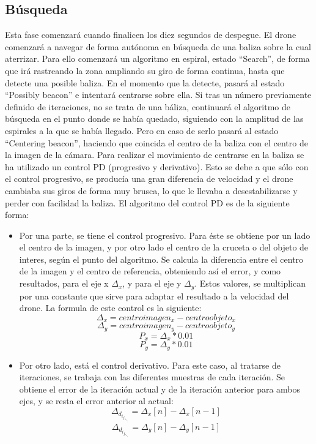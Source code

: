 \subsection{B\'usqueda}
\hspace{1 cm} Esta fase comenzar\'a cuando finalicen los diez segundos de despegue. El drone comenzar\'a a navegar de forma aut\'onoma en b\'usqueda de una baliza sobre la cual aterrizar. Para ello comenzar\'a un algoritmo en espiral, estado "`Search"', de forma que ir\'a rastreando la zona ampliando su giro de forma continua, hasta que detecte una posible baliza. En el momento que la detecte, pasar\'a al estado "`Possibly beacon"' e intentar\'a centrarse sobre ella. Si tras un n\'umero previamente definido de iteraciones, no se trata de una b\'aliza, continuar\'a el algoritmo de b\'usqueda en el punto donde se hab\'ia quedado, siguiendo con la amplitud de las espirales a la que se hab\'ia llegado. Pero en caso de serlo pasar\'a al estado "`Centering beacon"', haciendo que coincida el centro de la baliza con el centro de la imagen de la c\'amara. Para realizar el movimiento de centrarse en la baliza se ha utilizado un control PD (progresivo y derivativo). Esto se debe a que s\'olo con el control progresivo, se produc\'ia una gran diferencia de velocidad y el drone cambiaba sus giros de forma muy brusca, lo que le llevaba a desestabilizarse y perder con facilidad la baliza. El algoritmo del control PD es de la siguiente forma:

\begin{itemize}
\item Por una parte, se tiene el control progresivo. Para \'este se obtiene por un lado el centro de la imagen, y por otro lado el centro de la cruceta o del objeto de interes, seg\'un el punto del algoritmo. Se calcula la diferencia entre el centro de la imagen y el centro de referencia, obteniendo as\'i el error, y como resultados, para el eje x $\Delta_x$,  y para el eje y $\Delta_y$. Estos valores, se multiplican por una constante que sirve para adaptar el resultado a la velocidad del drone. La formula de este control es la siguiente:  \[\Delta_x = centroimagen_x - centroobjeto_x\]   \[\Delta_y = centroimagen_y - centroobjeto_y\]  \[ P_x = \Delta_x * 0.01\]  \[P_y = \Delta_y * 0.01\]


\item Por otro lado, est\'a el control derivativo. Para este caso, al tratarse de iteraciones, se trabaja con las diferentes muestras de cada iteración. Se obtiene el error de la iteraci\'on actual y de la iteraci\'on anterior para ambos ejes, y se resta el error anterior al actual: \[\Delta_d_i_f_e_r_e_n_c_i_a_x =  \Delta_x [n] - \Delta_x [n-1] \] \[\Delta_d_i_f_e_r_e_n_c_i_a_y =  \Delta_y [n] - \Delta_y [n-1] \]

\end{itemize}

